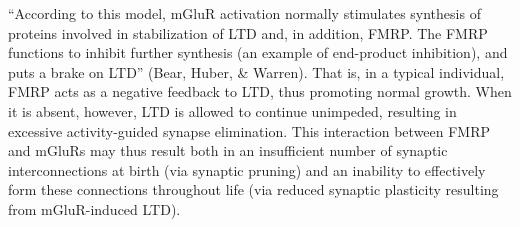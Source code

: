 ``According to this model, mGluR activation normally stimulates synthesis of proteins involved in stabilization of LTD and, in addition, FMRP. The FMRP functions to inhibit further synthesis (an example of end-product inhibition), and puts a brake on LTD'' (Bear, Huber, \& Warren). That is, in a typical individual, FMRP acts as a negative feedback to LTD, thus promoting normal growth. When it is absent, however, LTD is allowed to continue unimpeded, resulting in excessive activity-guided synapse elimination. This interaction between FMRP and mGluRs may thus result both in an insufficient number of synaptic interconnections at birth (via synaptic pruning) and an inability to effectively form these connections throughout life (via reduced synaptic plasticity resulting from mGluR-induced LTD).